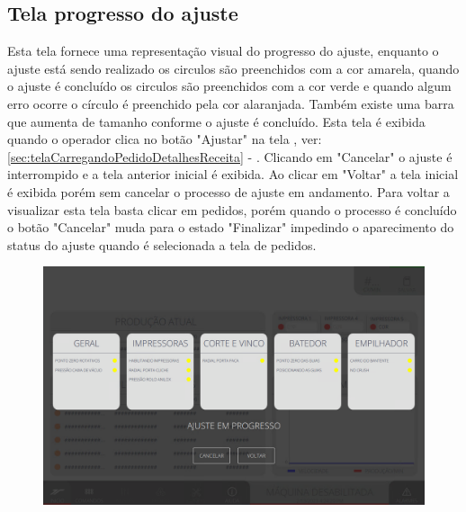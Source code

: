 \pagestyle{fancy}
\vspace*{40 pt}

\subsection{Tela progresso do ajuste}

Esta tela fornece uma representação visual do progresso do ajuste, enquanto o ajuste está sendo realizado os circulos são preenchidos com a cor amarela, quando o ajuste 
é concluído os circulos são preenchidos com a cor verde e quando algum erro ocorre o círculo é preenchido pela cor alaranjada. Também existe uma barra que aumenta de tamanho
conforme o ajuste é concluído.
Esta tela é exibida quando o operador clica no botão "Ajustar" na tela , ver: \ref{sec:telaCarregandoPedidoDetalhesReceita} - 
. Clicando em "Cancelar" o ajuste é interrompido e a tela anterior inicial é exibida. Ao clicar em "Voltar" a tela inicial é 
exibida porém sem cancelar o processo de ajuste em andamento. Para voltar a visualizar esta tela basta clicar em pedidos, porém quando o processo é concluído o botão "Cancelar" 
muda para o estado "Finalizar" impedindo o aparecimento do status do ajuste quando é selecionada a tela de pedidos.

\vspace*{\fill}
\begin{figure}[h]
    \centering
    \includegraphics[width=480 px,height=300 px]{src/imagesICV/15-setupProgress/1.png}
\end{figure}
\vspace*{\fill}